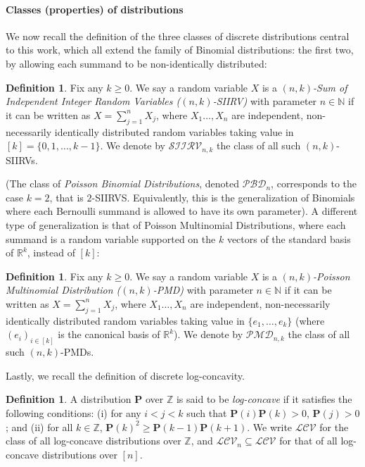 \documentclass[11pt]{article}
\theoremstyle{definition}
\newtheorem{definition}[theorem]{Definition}
\newcommand{\R}{\mathbb{R}}
\newcommand{\Z}{\mathbb{Z}}
\newcommand{\N}{\mathbb{N}}
\newcommand{\p}{\mathbf{P}}
\newcommand{\classpbd}[1][n]{\ensuremath{\mathcal{PBD}_{#1}}\xspace}
\newcommand{\classpmd}[2][n]{\ensuremath{\mathcal{PMD}_{#1,#2}}\xspace}
\newcommand{\classksiirv}[2][n]{\ensuremath{\mathcal{SIIRV}_{#1,#2}}\xspace}
\newcommand{\classlogconcave}{\ensuremath{\mathcal{LCV}}\xspace}
\begin{document}
\paragraph*{Classes (properties) of distributions} We now recall the definition of the three classes of discrete distributions central to this work, which all extend the family of Binomial distributions: the first two, by allowing each summand to be non-identically distributed:
\begin{definition}\label{def:siirv}
Fix any $k\geq 0$. We say a random variable $X$ is a \emph{$(n,k)$-Sum of Independent Integer Random Variables ($(n,k)$-SIIRV)} with parameter $n\in\N$ if it can be written as $X=\sum_{j=1}^n X_j$, where $X_1\dots,X_n$ are independent, non-necessarily identically distributed random variables taking value in $[k]=\{0,1,\dots,k-1\}$. We denote by $\classksiirv[n]{k}$ the class of all such $(n,k)$-SIIRVs.
\end{definition}
\noindent (The class of \emph{Poisson Binomial Distributions}, denoted $\classpbd[n]$, corresponds to the case $k=2$, that is $2$-SIIRVS. Equivalently, this is the generalization of Binomials where each Bernoulli summand is allowed to have its own parameter). A different type of generalization is that of Poisson Multinomial Distributions, where each summand is a random variable supported on the $k$ vectors of the standard basis of $\R^k$, instead of $[k]$:
\begin{definition}\label{def:pmd}
Fix any $k\geq 0$. We say a random variable $X$ is a \emph{$(n,k)$-Poisson Multinomial Distribution ($(n,k)$-PMD)} with parameter $n\in\N$ if it can be written as $X=\sum_{j=1}^n X_j$, where $X_1\dots,X_n$ are independent, non-necessarily identically distributed random variables taking value in $\{e_1,\dots,e_k\}$ (where $(e_i)_{i\in[k]}$ is the canonical basis of $\R^k$). We denote by $\classpmd[n]{k}$ the class of all such $(n,k)$-PMDs.
\end{definition}

\noindent Lastly, we recall the definition of discrete log-concavity.
\begin{definition}\label{def:logconcave}
  A distribution $\p$ over $\Z$ is said to be \emph{log-concave} if it satisfies the following conditions: \textsf{(i)} for any $i < j < k$ such that $\p(i)\p(k) > 0$, $\p(j) > 0$; and \textsf{(ii)} for all $k\in\Z$, $\p(k)^2 \geq \p(k-1)\p(k+1)$. We write $\classlogconcave$ for the class of all log-concave distributions over $\Z$, and $\classlogconcave_n\subseteq \classlogconcave$ for that of all log-concave distributions over $[n]$.
\end{definition}
\end{document}
